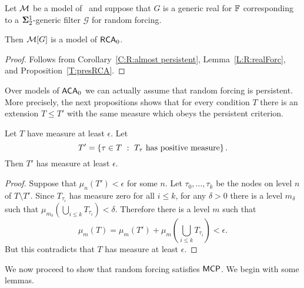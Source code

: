 \begin{thm}
Let $\mathcal{M}$ be a model of \RCAo\
and suppose that $G$ is a generic real for $\mathbb{F}$
corresponding to a $\mathbf{\Sigma}^1_2$-generic filter $\mathcal{G}$ for random forcing.

Then $\mathcal{M}[G]$ is a model of $\mathsf{RCA}_0$.
\end{thm}
\begin{proof}
Follows from Corollary~\ref{C:R:almost persistent}, Lemma~\ref{L:R:realForc}, and Proposition~\ref{T:presRCA}.
\end{proof}

Over models of $\mathsf{ACA}_0$ we can actually assume that
random forcing is persistent.
More precisely, the next propositions shows that for every condition $T$
there is an extension $T\leq T'$ with the same measure which obeys the persistent criterion.

\begin{prop}[\ACAo]\label{P:R:makePersistent}
Let $T$ have measure at least $\epsilon$.
Let $$T'=\left\{\tau\in T\ :\ T_\tau\text{ has positive measure}\right\}.$$
Then $T'$ has measure at least $\epsilon$.
\end{prop}
\begin{proof}
Suppose that $\mu_n(T')<\epsilon$ for some $n$.
Let $\tau_0,\ldots,\tau_k$ be the nodes on level $n$ of $T\setminus T'$.
Since $T_{\tau_i}$ has measure zero for all $i\leq k$,
for any $\delta>0$ there is a level $m_\delta$ such that
$\mu_{m_\delta}(\bigcup_{i\leq k}T_{\tau_i})<\delta$.
Therefore there is a level $m$ such that
$$\mu_m(T)=\mu_m(T')+\mu_{m}\left(\bigcup_{i\leq k}T_{\tau_i}\right)<\epsilon.$$
But this contradicts that $T$ has measure at least $\epsilon$.
\end{proof}

We now proceed to show that random forcing satisfies $\mathsf{MCP}$.
We begin with some lemmas.

